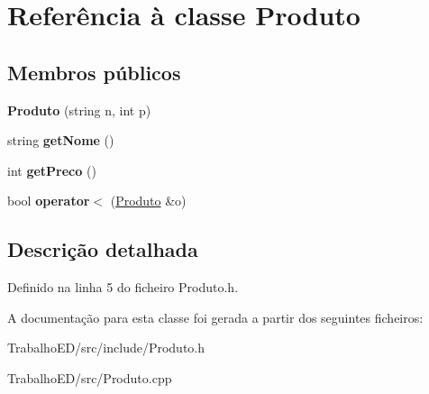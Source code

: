 \hypertarget{classProduto}{\section{Referência à classe Produto}
\label{classProduto}
}
\subsection*{Membros públicos}
\begin{DoxyCompactItemize}
\item 
\hypertarget{classProduto_af8a28945544529a5bb1b6f5da2e89625}{{\bfseries Produto} (string n, int p)}\label{classProduto_af8a28945544529a5bb1b6f5da2e89625}

\item 
\hypertarget{classProduto_ab85f6765ddb66a6100c7aa7d7ba379e6}{string {\bfseries get\-Nome} ()}\label{classProduto_ab85f6765ddb66a6100c7aa7d7ba379e6}

\item 
\hypertarget{classProduto_ad646a0dfabe3761ce7f9140db045404c}{int {\bfseries get\-Preco} ()}\label{classProduto_ad646a0dfabe3761ce7f9140db045404c}

\item 
\hypertarget{classProduto_ad0983b854c092a1032931693cfa4a915}{bool {\bfseries operator$<$} (\hyperlink{classProduto}{Produto} \&o)}\label{classProduto_ad0983b854c092a1032931693cfa4a915}

\end{DoxyCompactItemize}


\subsection{Descrição detalhada}


Definido na linha 5 do ficheiro Produto.\-h.



A documentação para esta classe foi gerada a partir dos seguintes ficheiros\-:\begin{DoxyCompactItemize}
\item 
Trabalho\-E\-D/src/include/Produto.\-h\item 
Trabalho\-E\-D/src/Produto.\-cpp\end{DoxyCompactItemize}
